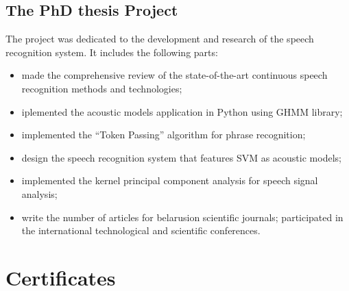 \documentclass[11pt,a4paper,sans]{moderncv}        %
\begin{document}
\subsection{The PhD thesis Project}
The project was dedicated to the development and research of the speech recognition system. It includes the following parts:

\begin{itemize}
  \item made the comprehensive review of the state-of-the-art continuous speech recognition methods and technologies;
  \item iplemented the acoustic models application in Python using GHMM library;
  \item implemented the ``Token Passing'' algorithm for phrase recognition;
  \item design the speech recognition system that features SVM as acoustic models;
  \item implemented the kernel principal component analysis for speech signal analysis;
  \item write the number of articles for belarusion scientific journals;
participated in the international technological and scientific conferences.
\end{itemize}

\section{Certificates}




\end{document}
